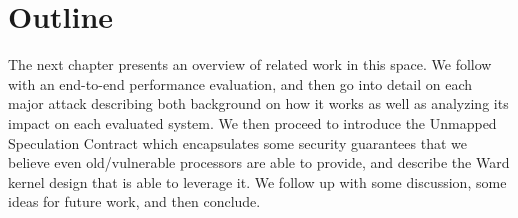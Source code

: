 


\section{Outline}
The next chapter presents an overview of related work in this space.
We follow with an end-to-end performance evaluation, and then go into detail on each major attack describing both background on how it works as well as analyzing its impact on each evaluated system.
We then proceed to introduce the Unmapped Speculation Contract which encapsulates some security guarantees that we believe even old/vulnerable processors are able to provide, and describe the Ward kernel design that is able to leverage it.
We follow up with some discussion, some ideas for future work, and then conclude.
